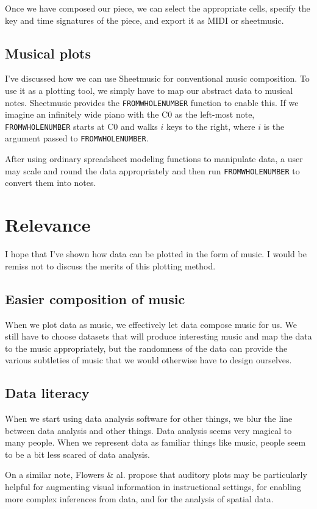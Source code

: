 \documentclass{acm_proc_article-sp}
\begin{document}
Once we have composed our piece, we can select the appropriate cells,
specify the key and time signatures of the piece, and export it as
MIDI or sheetmusic.

\subsection{Musical plots}
I've discussed how we can use Sheetmusic for conventional music
composition. To use it as a plotting tool, we simply have to map
our abstract data to musical notes. Sheetmusic provides the
\texttt{FROMWHOLENUMBER} function to enable this. If we imagine an
infinitely wide piano with the C0 as the left-most note,
\texttt{FROMWHOLENUMBER} starts at C0 and walks $i$ keys to the right,
where $i$ is the argument passed to \texttt{FROMWHOLENUMBER}.

After using ordinary spreadsheet modeling functions to manipulate data,
a user may scale and round the data appropriately and then run
\texttt{FROMWHOLENUMBER} to convert them into notes.

\section{Relevance}
I hope that I've shown how data can be plotted in the form of music.
I would be remiss not to discuss the merits of this plotting method.

\subsection{Easier composition of music}
When we plot data as music, we effectively let data compose music for us.
We still have to choose datasets that will produce interesting music and
map the data to the music appropriately, but the randomness of the data
can provide the various subtleties of music that we would otherwise have
to design ourselves.

\subsection{Data literacy}
When we start using data analysis software for other things,
we blur the line between data analysis and other things.
Data analysis seems very magical to many people. When we represent
data as familiar things like music, people seem to be a bit less
scared of data analysis.

On a similar note,
Flowers \& al. \cite{flowers2005} propose that auditory plots may be
particularly helpful for augmenting visual information in instructional
settings, for enabling more complex inferences from data, and for
the analysis of spatial data.
\end{document}
